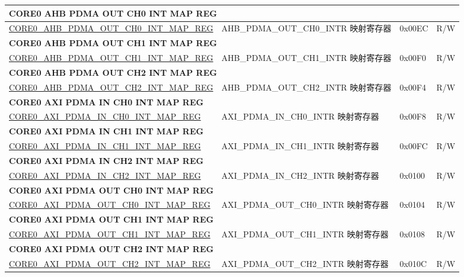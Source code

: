 \begin{longtable}{ | p{8.7cm} | p{6.2cm} | p{1.3cm} | p{1cm} | }
\multicolumn{4}{|l|}{\textbf{CORE0 AHB PDMA OUT CH0 INT MAP REG}} \\ \hline
\hyperref[regdesc:CORE0AHBPDMAOUTCH0INTMAPREG]{CORE0\_AHB\_PDMA\_OUT\_CH0\_INT\_MAP\_REG} & AHB\_PDMA\_OUT\_CH0\_INTR 映射寄存器 & 0x00EC & R/W \\ \hline
\multicolumn{4}{|l|}{\textbf{CORE0 AHB PDMA OUT CH1 INT MAP REG}} \\ \hline
\hyperref[regdesc:CORE0AHBPDMAOUTCH1INTMAPREG]{CORE0\_AHB\_PDMA\_OUT\_CH1\_INT\_MAP\_REG} & AHB\_PDMA\_OUT\_CH1\_INTR 映射寄存器 & 0x00F0 & R/W \\ \hline
\multicolumn{4}{|l|}{\textbf{CORE0 AHB PDMA OUT CH2 INT MAP REG}} \\ \hline
\hyperref[regdesc:CORE0AHBPDMAOUTCH2INTMAPREG]{CORE0\_AHB\_PDMA\_OUT\_CH2\_INT\_MAP\_REG} & AHB\_PDMA\_OUT\_CH2\_INTR 映射寄存器 & 0x00F4 & R/W \\ \hline
\multicolumn{4}{|l|}{\textbf{CORE0 AXI PDMA IN CH0 INT MAP REG}} \\ \hline
\hyperref[regdesc:CORE0AXIPDMAINCH0INTMAPREG]{CORE0\_AXI\_PDMA\_IN\_CH0\_INT\_MAP\_REG} & AXI\_PDMA\_IN\_CH0\_INTR 映射寄存器 & 0x00F8 & R/W \\ \hline
\multicolumn{4}{|l|}{\textbf{CORE0 AXI PDMA IN CH1 INT MAP REG}} \\ \hline
\hyperref[regdesc:CORE0AXIPDMAINCH1INTMAPREG]{CORE0\_AXI\_PDMA\_IN\_CH1\_INT\_MAP\_REG} & AXI\_PDMA\_IN\_CH1\_INTR 映射寄存器 & 0x00FC & R/W \\ \hline
\multicolumn{4}{|l|}{\textbf{CORE0 AXI PDMA IN CH2 INT MAP REG}} \\ \hline
\hyperref[regdesc:CORE0AXIPDMAINCH2INTMAPREG]{CORE0\_AXI\_PDMA\_IN\_CH2\_INT\_MAP\_REG} & AXI\_PDMA\_IN\_CH2\_INTR 映射寄存器 & 0x0100 & R/W \\ \hline
\multicolumn{4}{|l|}{\textbf{CORE0 AXI PDMA OUT CH0 INT MAP REG}} \\ \hline
\hyperref[regdesc:CORE0AXIPDMAOUTCH0INTMAPREG]{CORE0\_AXI\_PDMA\_OUT\_CH0\_INT\_MAP\_REG} & AXI\_PDMA\_OUT\_CH0\_INTR 映射寄存器 & 0x0104 & R/W \\ \hline
\multicolumn{4}{|l|}{\textbf{CORE0 AXI PDMA OUT CH1 INT MAP REG}} \\ \hline
\hyperref[regdesc:CORE0AXIPDMAOUTCH1INTMAPREG]{CORE0\_AXI\_PDMA\_OUT\_CH1\_INT\_MAP\_REG} & AXI\_PDMA\_OUT\_CH1\_INTR 映射寄存器 & 0x0108 & R/W \\ \hline
\multicolumn{4}{|l|}{\textbf{CORE0 AXI PDMA OUT CH2 INT MAP REG}} \\ \hline
\hyperref[regdesc:CORE0AXIPDMAOUTCH2INTMAPREG]{CORE0\_AXI\_PDMA\_OUT\_CH2\_INT\_MAP\_REG} & AXI\_PDMA\_OUT\_CH2\_INTR 映射寄存器 & 0x010C & R/W \\ \hline

\end{longtable}
